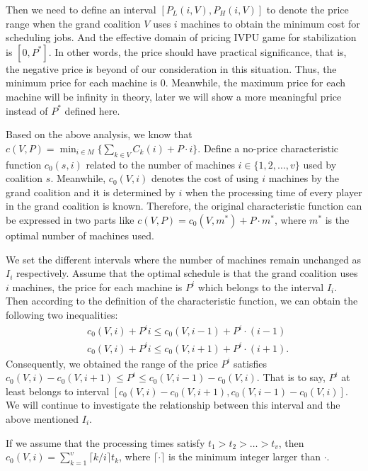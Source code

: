 Then we need to define an interval $[P_L(i,V),P_H(i,V)]$ to denote the price range when the grand coalition $V$ uses $i$ machines to obtain the minimum cost for scheduling jobs. And the effective domain of pricing IVPU game for stabilization is $[0,P^*]$.
In other words, the price should have practical significance, that is, the negative price is beyond of our consideration in this situation. Thus, the minimum price for each machine is 0. Meanwhile, the maximum price for each machine will be infinity in theory, later we will show a more meaningful price instead of $P^*$ defined here.

Based on the above analysis, we know that $c(V,P) = \min_{i \in M} \{\sum_{k\in V}{C_k(i)}+ P\cdot i\}.$ Define a no-price characteristic function $c_0(s,i)$
related to the number of machines $i \in \{1,2,\ldots,v\}$ used by coalition $s.$ Meanwhile, $c_0(V,i)$ denotes the cost of using $i$ machines by the grand coalition and it is determined by $i$ when the processing time of every player in the grand coalition is known.
Therefore, the original characteristic function can be expressed in two parts like $c(V,P) = c_0(V,m^*) + P\cdot m^*$, where $m^*$ is the optimal number of machines used.

We set the different intervals where the number of machines remain unchanged as $I_i$ respectively.
Assume that the optimal schedule is that the grand coalition uses $i$ machines, the price for each machine is $P^i$ which belongs to the interval $I_i$.
Then according to the definition of the characteristic function, we can obtain the following two inequalities:
\[
\begin{aligned}
&c_0 (V,i) + P^i i \leq c_0 (V,i-1) + P^i\cdot(i-1) \\
&c_0 (V,i) + P^i i \leq c_0 (V,i+1) + P^i\cdot(i+1).
\end{aligned}
\]
Consequently, we obtained the range of the price $P^i$ satisfies $c_0 (V,i) - c_0 (V,i+1) \leq P^i \leq c_0 (V,i-1) - c_0 (V,i)$.
That is to say, $P^i$ at least belongs to interval $[c_0 (V,i) - c_0 (V,i+1), c_0 (V,i-1) - c_0 (V,i)].$
We will continue to investigate the relationship between this interval and the above mentioned $I_i$.


If we assume that the processing times satisfy $t_1 > t_2 > \ldots > t_v$, then $c_0(V,i) = \sum_{k=1}^{v} {\lceil k/i \rceil} t_{k}$, where $\lceil \cdot \rceil$ is the minimum integer larger than $\cdot$.

